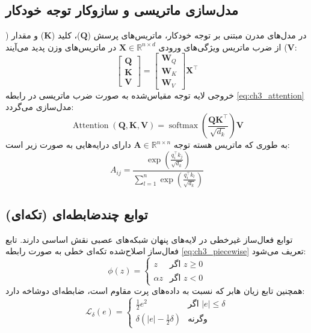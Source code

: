 \subsection{مدل‌سازی ماتریسی و سازوکار توجه خودکار}
در مدل‌های مدرن مبتنی بر توجه خودکار، ماتریس‌های پرسش ($\mathbf{Q}$)، کلید ($\mathbf{K}$) و مقدار ($\mathbf{V}$) از ضرب ماتریس ویژگی‌های ورودی $\mathbf{X} \in \mathbb{R}^{n \times d}$ در ماتریس‌های وزن پدید می‌آیند:
\begin{equation}
\label{eq:ch3_matrices}
\begin{bmatrix}
\mathbf{Q} \\
\mathbf{K} \\
\mathbf{V}
\end{bmatrix}
=
\begin{bmatrix}
\mathbf{W}_Q \\
\mathbf{W}_K \\
\mathbf{W}_V
\end{bmatrix}
\mathbf{X}^\top
\end{equation}
خروجی لایه توجه مقیاس‌شده به صورت ضرب ماتریسی در رابطه \eqref{eq:ch3_attention} مدل‌سازی می‌گردد:
\begin{equation}
\label{eq:ch3_attention}
\operatorname{Attention}(\mathbf{Q}, \mathbf{K}, \mathbf{V}) = \operatorname{softmax}\left( \frac{\mathbf{Q} \mathbf{K}^\top}{\sqrt{d_k}} \right) \mathbf{V}
\end{equation}
به طوری که ماتریس هسته توجه $\mathbf{A} \in \mathbb{R}^{n \times n}$ دارای درایه‌هایی به صورت زیر است:
\begin{equation}
\label{eq:ch3_softmax_matrix}
A_{ij} = \frac{\exp\left(\frac{q_i^\top k_j}{\sqrt{d_k}}\right)}{\sum_{l=1}^n \exp\left(\frac{q_i^\top k_l}{\sqrt{d_k}}\right)}
\end{equation}

\subsection{توابع چندضابطه‌ای (تکه‌ای)}
توابع فعال‌ساز غیرخطی در لایه‌های پنهان شبکه‌های عصبی نقش اساسی دارند. تابع فعال‌ساز اصلاح‌شده تکه‌ای خطی به صورت رابطه \eqref{eq:ch3_piecewise} تعریف می‌شود:
\begin{equation}
\label{eq:ch3_piecewise}
\phi(z) =
\begin{cases}
z & \text{اگر } z \ge 0 \\
\alpha z & \text{اگر } z < 0
\end{cases}
\end{equation}
همچنین تابع زیان هابر که نسبت به داده‌های پرت مقاوم است، ضابطه‌ای دوشاخه دارد:
\begin{equation}
\label{eq:ch3_huber}
\mathcal{L}_\delta(e) =
\begin{cases}
\frac{1}{2} e^2 & \text{اگر } |e| \le \delta \\[1em]
\delta \left( |e| - \frac{1}{2} \delta \right) & \text{وگرنه}
\end{cases}
\end{equation}

